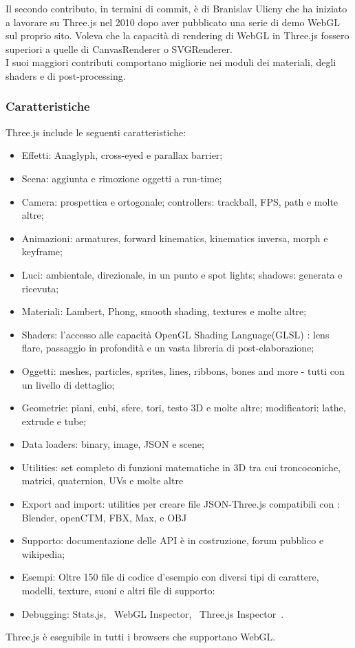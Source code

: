 Il secondo contributo, in termini di commit, è di Branislav Ulicny che ha iniziato a lavorare su Three.js nel 2010
dopo aver pubblicato una serie di demo WebGL sul proprio sito. Voleva che la capacit\`a di rendering di WebGL in Three.js
fossero superiori a quelle di CanvasRenderer o SVGRenderer.~\cite{develop}\\
I suoi maggiori contributi comportano migliorie nei moduli dei materiali, degli shaders e di post-processing.

\subsubsection{Caratteristiche}
Three.js include le seguenti caratteristiche:~\cite{mrdoob}
\begin{itemize}

\item Effetti: Anaglyph, cross-eyed e parallax barrier;
\item Scena: aggiunta e rimozione oggetti a run-time;
\item Camera: prospettica e ortogonale; controllers: trackball, FPS, path e molte altre;
\item Animazioni: armatures, forward kinematics, kinematics inversa, morph e keyframe;
\item Luci: ambientale, direzionale, in un punto e spot lights; shadows: generata e ricevuta;
\item Materiali: Lambert, Phong, smooth shading, textures e molte altre;
\item Shaders: l'accesso alle capacità OpenGL Shading Language(GLSL) : lens flare, passaggio in profondità e un vasta libreria di post-elaborazione;
\item Oggetti: meshes, particles, sprites, lines, ribbons, bones and more - tutti con un livello di dettaglio;
\item Geometrie: piani, cubi, sfere, tori, testo 3D e molte altre; modificatori: lathe, extrude e tube;
\item Data loaders: binary, image, JSON e scene;
\item Utilities: set completo di funzioni matematiche in 3D tra cui troncoconiche, matrici, quaternion, UVs e molte altre
\item Export and import: utilities per creare file JSON-Three.js compatibili con : Blender, openCTM, FBX, Max, e OBJ
\item Supporto: documentazione delle API è in costruzione, forum pubblico e wikipedia;
\item Esempi: Oltre 150 file di codice d'esempio con diversi tipi di carattere, modelli, texture, suoni e altri file di supporto:
\item Debugging: Stats.js,~\cite{stats.js} WebGL Inspector,~\cite{webglinspector} Three.js Inspector~\cite{threejsinspector}.
\end{itemize}

Three.js è eseguibile in tutti i browsers che supportano WebGL.
